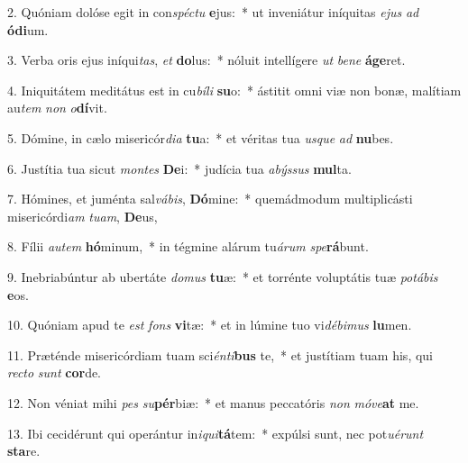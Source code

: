 2. Quóniam dolóse egit in con\textit{spéc}\textit{tu} \textbf{e}jus:~*  ut inveniátur iníquitas \textit{e}\textit{jus} \textit{ad} \textbf{ó}\textbf{di}um.\

3. Verba oris ejus iníqui\textit{tas}, \textit{et} \textbf{do}lus:~*  nóluit intellígere \textit{ut} \textit{be}\textit{ne} \textbf{á}\textbf{ge}ret.\

4. Iniquitátem meditátus est in cu\textit{bí}\textit{li} \textbf{su}o:~*  ástitit omni viæ non bonæ, malítiam au\textit{tem} \textit{non} \textit{o}\textbf{dí}vit.\

5. Dómine, in cælo misericór\textit{di}\textit{a} \textbf{tu}a:~*  et véritas tua \textit{us}\textit{que} \textit{ad} \textbf{nu}bes.\

6. Justítia tua sicut \textit{mon}\textit{tes} \textbf{De}i:~*  judícia tua \textit{a}\textit{býs}\textit{sus} \textbf{mul}ta.\

7. Hómines, et juménta sal\textit{vá}\textit{bis}, \textbf{Dó}mine:~*  quemádmodum multiplicásti misericórdi\textit{am} \textit{tu}\textit{am}, \textbf{De}us,\

8. Fílii \textit{au}\textit{tem} \textbf{hó}minum,~*  in tégmine alárum tu\textit{á}\textit{rum} \textit{spe}\textbf{rá}bunt.\

9. Inebriabúntur ab ubertáte \textit{do}\textit{mus} \textbf{tu}æ:~*  et torrénte voluptátis tuæ \textit{po}\textit{tá}\textit{bis} \textbf{e}os.\

10. Quóniam apud te \textit{est} \textit{fons} \textbf{vi}tæ:~*  et in lúmine tuo vi\textit{dé}\textit{bi}\textit{mus} \textbf{lu}men.\

11. Præténde misericórdiam tuam sci\textit{én}\textit{ti}\textbf{bus} te,~*  et justítiam tuam his, qui \textit{rec}\textit{to} \textit{sunt} \textbf{cor}de.\

12. Non véniat mihi \textit{pes} \textit{su}\textbf{pér}biæ:~*  et manus peccatóris \textit{non} \textit{mó}\textit{ve}\textbf{at} me.\

13. Ibi cecidérunt qui operántur in\textit{i}\textit{qui}\textbf{tá}tem:~*  expúlsi sunt, nec pot\textit{u}\textit{é}\textit{runt} \textbf{sta}re.\

